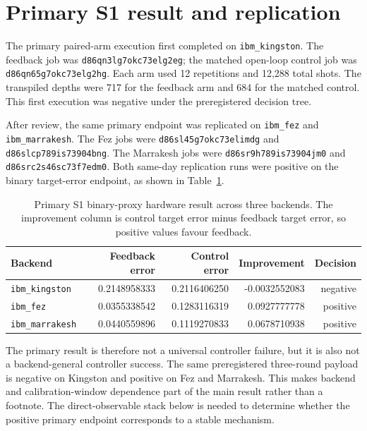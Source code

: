 \documentclass[preprint,aps,physrev,superscriptaddress,floatfix,longbibliography]{revtex4-2}
\begin{document}
\section{Primary S1 result and replication}

The primary paired-arm execution first completed on \texttt{ibm\_kingston}.
The feedback job was \texttt{d86qn3lg7okc73elg2eg}; the matched open-loop
control job was \texttt{d86qn65g7okc73elg2hg}. Each arm used 12 repetitions
and 12,288 total shots. The transpiled depths were 717 for the feedback arm
and 684 for the matched control. This first execution was negative under the
preregistered decision tree.

After review, the same primary endpoint was replicated on \texttt{ibm\_fez}
and \texttt{ibm\_marrakesh}. The Fez jobs were
\texttt{d86sl45g7okc73elimdg} and \texttt{d86slcp789is73904bng}. The
Marrakesh jobs were \texttt{d86sr9h789is73904jm0} and
\texttt{d86src2s46sc73f7edm0}. Both same-day replication runs were positive
on the binary target-error endpoint, as shown in Table~\ref{tab:s1-primary}.

\begin{table}[tb]
\centering
\small
\begin{tabular}{lrrrr}
\toprule
Backend & Feedback error & Control error & Improvement & Decision \\
\midrule
\texttt{ibm\_kingston} & 0.2148958333 & 0.2116406250 & -0.0032552083 & negative \\
\texttt{ibm\_fez} & 0.0355338542 & 0.1283116319 & 0.0927777778 & positive \\
\texttt{ibm\_marrakesh} & 0.0440559896 & 0.1119270833 & 0.0678710938 & positive \\
\bottomrule
\end{tabular}
\caption{Primary S1 binary-proxy hardware result across three backends. The
improvement column is control target error minus feedback target error, so
positive values favour feedback.}
\label{tab:s1-primary}
\end{table}

The primary result is therefore not a universal controller failure, but it is
also not a backend-general controller success. The same preregistered
three-round payload is negative on Kingston and positive on Fez and
Marrakesh. This makes backend and calibration-window dependence part of the
main result rather than a footnote. The direct-observable stack below is
needed to determine whether the positive primary endpoint corresponds to a
stable mechanism.
\end{document}

